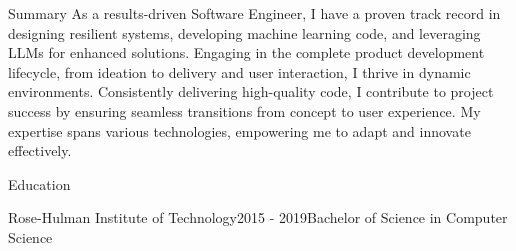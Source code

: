 \documentclass{resume} %
\begin{document}
\begin{rSection}{Summary}
{As a results-driven Software Engineer, I have a proven track record in designing resilient systems, developing machine learning code, and leveraging LLMs for enhanced solutions. Engaging in the complete product development lifecycle, from ideation to delivery and user interaction, I thrive in dynamic environments. Consistently delivering high-quality code, I contribute to project success by ensuring seamless transitions from concept to user experience. My expertise spans various technologies, empowering me to adapt and innovate effectively.}
\end{rSection}

\begin{rSection}{Education}
\begin{rsemisection}{Rose-Hulman Institute of Technology}{2015 - 2019}{Bachelor of Science in Computer Science}
\end{rsemisection}
\end{rSection}
\end{document}
